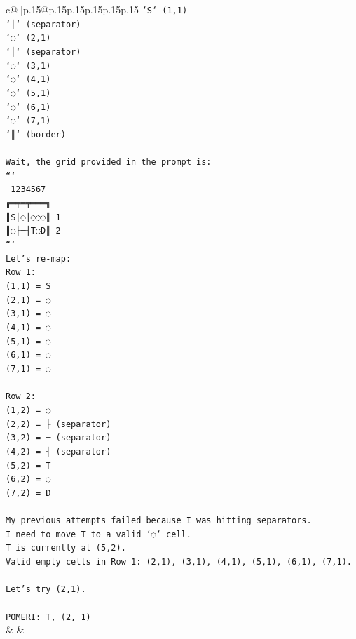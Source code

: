 \documentclass{article}
\begin{document}
{\begin{supertabular}{c@{$\;$}|p{.15\linewidth}@{}p{.15\linewidth}p{.15\linewidth}p{.15\linewidth}p{.15\linewidth}p{.15\linewidth}}
{{{\texttt{`S` (1,1)} \\
\texttt{`│` (separator)} \\
\texttt{`◌` (2,1)} \\
\texttt{`│` (separator)} \\
\texttt{`◌` (3,1)} \\
\texttt{`◌` (4,1)} \\
\texttt{`◌` (5,1)} \\
\texttt{`◌` (6,1)} \\
\texttt{`◌` (7,1)} \\
\texttt{`║` (border)} \\
\\ 
\texttt{Wait, the grid provided in the prompt is:} \\
\texttt{```} \\
\texttt{ 1234567} \\
\texttt{╔═╤═╤═══╗} \\
\texttt{║S│◌│◌◌◌║ 1} \\
\texttt{║◌├─┤T◌D║ 2} \\
\texttt{```} \\
\texttt{Let's re{-}map:} \\
\texttt{Row 1:} \\
\texttt{(1,1) = S} \\
\texttt{(2,1) = ◌} \\
\texttt{(3,1) = ◌} \\
\texttt{(4,1) = ◌} \\
\texttt{(5,1) = ◌} \\
\texttt{(6,1) = ◌} \\
\texttt{(7,1) = ◌} \\
\\ 
\texttt{Row 2:} \\
\texttt{(1,2) = ◌} \\
\texttt{(2,2) = ├ (separator)} \\
\texttt{(3,2) = ─ (separator)} \\
\texttt{(4,2) = ┤ (separator)} \\
\texttt{(5,2) = T} \\
\texttt{(6,2) = ◌} \\
\texttt{(7,2) = D} \\
\\ 
\texttt{My previous attempts failed because I was hitting separators.} \\
\texttt{I need to move T to a valid `◌` cell.} \\
\texttt{T is currently at (5,2).} \\
\texttt{Valid empty cells in Row 1: (2,1), (3,1), (4,1), (5,1), (6,1), (7,1).} \\
\\ 
\texttt{Let's try (2,1).} \\
\\ 
\texttt{POMERI: T, (2, 1)} \\
            }
        }
    }
    & & \\ \\


\end{supertabular}}
\end{document}
